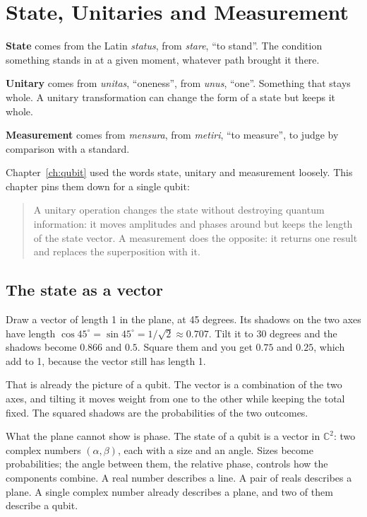 \chapter{State, Unitaries and Measurement}\label{ch:state}

\begin{etymology}
\textbf{State} comes from the Latin \emph{status}, from \emph{stare}, ``to
stand''. The condition something stands in at a given moment, whatever path
brought it there.

\textbf{Unitary} comes from \emph{unitas}, ``oneness'', from \emph{unus},
``one''. Something that stays whole. A unitary transformation can change the form
of a state but keeps it whole.

\textbf{Measurement} comes from \emph{mensura}, from \emph{metiri}, ``to measure'',
to judge by comparison with a standard.
\end{etymology}

Chapter~\ref{ch:qubit} used the words state, unitary and measurement loosely.
This chapter pins them down for a single qubit:

\begin{quote}
A unitary operation changes the state without destroying quantum information: it
moves amplitudes and phases around but keeps the length of the state vector. A
measurement does the opposite: it returns one result and replaces the
superposition with it.
\end{quote}

\section{The state as a vector}

Draw a vector of length 1 in the plane, at 45 degrees. Its shadows on the two
axes have length $\cos 45^\circ = \sin 45^\circ = 1/\sqrt{2} \approx 0.707$. Tilt it
to 30 degrees and the shadows become $0.866$ and $0.5$. Square them and you get
$0.75$ and $0.25$, which add to 1, because the vector still has length 1.

That is already the picture of a qubit. The vector is a combination of the two
axes, and tilting it moves weight from one to the other while keeping the total
fixed. The squared shadows are the probabilities of the two outcomes.

What the plane cannot show is phase. The state of a qubit is a vector in
$\mathbb{C}^2$: two complex numbers $(\alpha, \beta)$, each with a size and an
angle. Sizes become probabilities; the angle between them, the relative phase,
controls how the components combine. A real number describes a line. A pair of
reals describes a plane. A single complex number already describes a plane, and
two of them describe a qubit.

